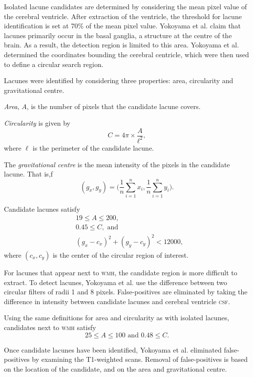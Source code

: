 Isolated lacune candidates are determined by considering the mean pixel value of the cerebral ventricle. After extraction of the ventricle, the threshold for lacune identification is set at 70\% of the mean pixel value. Yokoyama et al. claim that lacunes primarily occur in the basal ganglia, a structure at the centre of the brain. As a result, the detection region is limited to this area. Yokoyama et al. determined the coordinates bounding the cerebral centricle, which were then used to define a circular search region.

Lacunes were identified by considering three properties: area, circularity and gravitational centre.

\textit{Area}, $A$, is the number of pixels that the candidate lacune covers. 

\textit{Circularity} is given by
\[
	C = 4\pi \times \dfrac{A}{\ell^2},
\]
where $\ell$ is the perimeter of the candidate lacune.

The \textit{gravitational centre} is the mean intensity of the pixels in the candidate lacune. That is,f
\[
	(g_x, g_y) = \bigg(\dfrac{1}{n}\sum_{i=1}^nx_i, \dfrac{1}{n}\sum_{i=1}^ny_i\bigg).
\]


Candidate lacunes satisfy
\begin{align*}
	& 19 \le A \le 200, \\
	& 0.45 \le C,\text{ and } \\
	& (g_x - c_x)^2 + (g_y - c_y)^2 < 12000,
\end{align*}
where $(c_x, c_y)$ is the center of the circular region of interest.

For lacunes that appear next to \textsc{wmh}, the candidate region is more difficult to extract. To detect lacunes, Yokoyama et al. use the difference between two circular filters of radii 1 and 8 pixels. False-positives are eliminated by taking the difference in intensity between candidate lacunes and cerebral ventricle \textsc{csf}.

Using the same definitions for area and circularity as with isolated lacunes, candidates next to \textsc{wmh} satisfy
\[
	25 \le A \le 100\text{ and } 0.48 \le C.
\]

Once candidate lacunes have been identified, Yokoyama et al. eliminated false-positives by examining the T1-weighted scans. Removal of false-positives is based on the location of the candidate, and on the area and gravitational centre.

